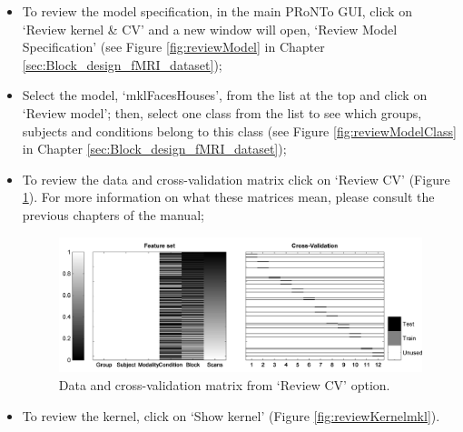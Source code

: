 \begin{itemize}
\item To review the model specification, in the main PRoNTo GUI, click on `Review kernel \& CV' and a new window will open, `Review Model Specification' (see Figure \ref{fig:reviewModel} in Chapter \ref{sec:Block_design_fMRI_dataset});


\item Select the model, `mklFacesHouses', from the list at the top and click on `Review model'; then, select one class from the list to see which groups, subjects and conditions belong to this class (see Figure \ref{fig:reviewModelClass} in Chapter \ref{sec:Block_design_fMRI_dataset});


\item To review the data and cross-validation matrix click on `Review CV' (Figure \ref{fig:reviewCVmkl}). For more information on what these matrices mean, please consult the previous chapters of the manual;

\begin{figure}[!h]
	\centering
		\includegraphics[scale=0.7]{images/Tutorial/mkl/reviewCVmkl.png}
	\caption{Data and cross-validation matrix from `Review CV' option.}
	\label{fig:reviewCVmkl}
\end{figure}

\item To review the kernel, click on `Show kernel' (Figure \ref{fig:reviewKernelmkl}).


\end{itemize}
